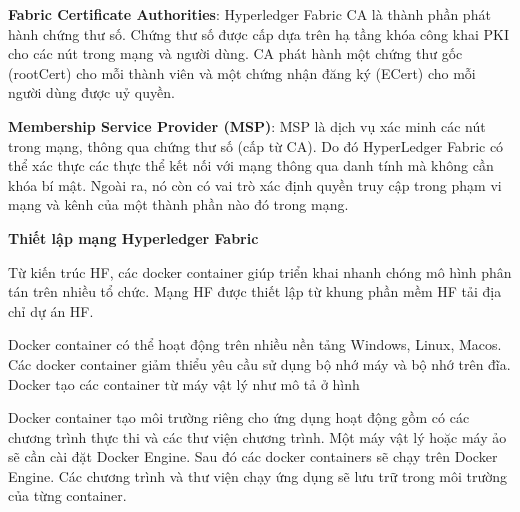 \textbf{Fabric Certificate Authorities}: Hyperledger Fabric CA là thành phần phát hành chứng thư số. Chứng thư số được cấp dựa trên hạ tầng khóa công khai PKI cho các nút trong mạng và người dùng. CA phát hành một chứng thư gốc (rootCert) cho mỗi thành viên và một chứng nhận đăng ký (ECert) cho mỗi người dùng được uỷ quyền.

\textbf{Membership Service Provider (MSP)}: MSP là dịch vụ xác minh các nút trong mạng, thông qua chứng thư số (cấp từ CA). Do đó HyperLedger Fabric có thể xác thực các thực thể kết nối với mạng thông qua danh tính mà không cần khóa bí mật. Ngoài ra, nó còn có vai trò xác định quyền truy cập trong phạm vi mạng và kênh của một thành phần nào đó trong mạng.

\textbf{Thiết lập mạng Hyperledger Fabric}

Từ kiến trúc HF, các docker container giúp triển khai nhanh chóng  mô hình phân tán trên nhiều tổ chức. Mạng HF được thiết lập từ khung phần mềm HF tải địa chỉ dự án HF.

Docker container có thể hoạt động trên nhiều nền tảng Windows, Linux, Macos. Các docker container giảm thiểu yêu cầu sử dụng bộ nhớ máy và bộ nhớ trên đĩa. Docker tạo các container từ máy vật lý như mô tả ở hình 

Docker container tạo môi trường riêng cho ứng dụng hoạt động gồm có các chương trình thực thi và các thư viện chương trình. Một máy vật lý hoặc máy ảo sẽ cần cài đặt Docker Engine. Sau đó các docker containers sẽ chạy trên Docker Engine. Các chương trình và thư viện chạy ứng dụng sẽ lưu trữ trong môi trường của từng container.  






